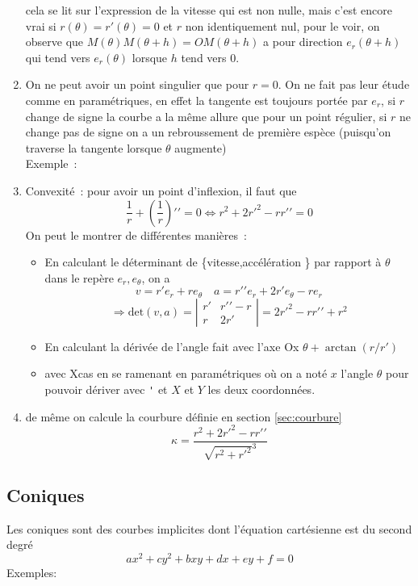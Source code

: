 \documentclass[a4paper,11pt]{article}
\begin{document}
\begin{giacjshere}
\begin{enumerate}
{cela se lit sur l'expression de la vitesse qui est non nulle, mais
c'est encore vrai si $r(\theta)=r'(\theta)=0$ et $r$ non identiquement nul, 
pour le voir, on observe que $M(\theta)M(\theta+h)=OM(\theta+h)$ a pour
direction $e_r(\theta+h)$ qui tend vers $e_r(\theta)$ lorsque $h$ tend
vers 0.}
\item On ne peut avoir un point singulier que pour $r=0$. On ne fait
pas leur \'etude comme en param\'etriques, en effet la tangente est
toujours port\'ee par $e_r$, si $r$ change de signe la courbe
a la m\^eme allure que pour un point r\'egulier, si $r$ ne change pas
de signe on a un rebroussement de premi\`ere esp\`ece (puisqu'on
traverse la tangente lorsque $\theta$ augmente)\\
Exemple~: 
\item Convexité~:  pour avoir un point d'inflexion, il faut que 
$$\frac1r + \left(\frac1r\right)'{'}=0
\Leftrightarrow
r^2+2r'^2-rr'{'}=0
$$
On peut le montrer de diff\'erentes mani\`eres~:
\begin{itemize}
\item En calculant le d\'eterminant de \{vitesse,acc\'el\'eration \}
par rapport \`a $\theta$ dans le rep\`ere $e_r,e_\theta$, on a
$$v=r'e_r+re_\theta \quad a=r'{'}e_r+2r'e_\theta-re_r$$
$$ \Rightarrow \mbox{det}(v,a)=\left| \begin{array}{cc} r' & r'{'}-r \\
r & 2r'\end{array}\right|=2r'^2-r r'{'}+r^2$$ 
\item En calculant la d\'eriv\'ee de l'angle fait avec l'axe Ox
$\theta+\arctan(r/r')$ 
\item avec Xcas en se ramenant en param\'etriques
où on a noté $x$ l'angle $\theta$ pour pouvoir dériver avec \verb|'|
et $X$ et $Y$ les deux coordonnées.
\end{itemize}
\item de même on calcule la courbure d\'efinie en section \ref{sec:courbure}
$$ \kappa = \frac{r^2+2r'^2-rr'{'}}{\sqrt{r^2+r'^2}^3}$$
\end{enumerate}

\subsection{Coniques}
Les coniques sont des courbes implicites dont l'\'equation
cart\'esienne est du second degr\'e~
$$ax^2+cy^2+bxy+dx+ey+f=0$$
Exemples:\\


\end{giacjshere}
\end{document}
